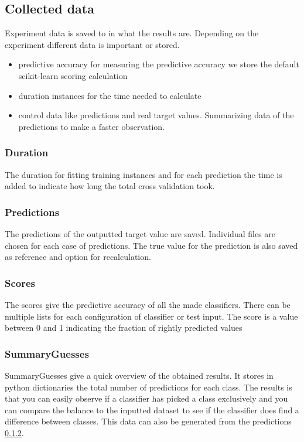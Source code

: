 \documentclass[a4paper,10pt]{article}
\begin{document}
\subsection{Collected data}
Experiment data is saved to in what the results are. Depending on the experiment different data is important or stored. 
\begin{itemize}
	\item predictive accuracy for measuring the predictive accuracy we store the default scikit-learn scoring calculation
	\item duration instances for the time needed to calculate 
	\item control data like predictions and real target values. Summarizing data of the predictions to make a faster observation. 
\end{itemize}


\subsubsection{Duration}
The duration for fitting training instances and for each prediction the time is added to indicate how long the total cross validation took. 

\subsubsection{Predictions}\label{pred}
The predictions of the outputted target value are saved. Individual files are chosen for each case of predictions. The true value for the prediction is also saved as reference and option for recalculation. 

\subsubsection{Scores}
The scores give the predictive accuracy of all the made classifiers. There can be multiple lists for each configuration of classifier or test input. The score is a value between 0 and 1 indicating the fraction of rightly predicted values

\subsubsection{SummaryGuesses}
SummaryGuesses give a quick overview of the obtained results. It stores in python dictionaries the total number of predictions for each class. The results is that you can easily observe if a classifier has picked a class exclusively and you can compare the balance to the inputted dataset to see if the classifier does find a difference between classes. This data can also be generated from the predictions \ref{pred}.
\end{document}
